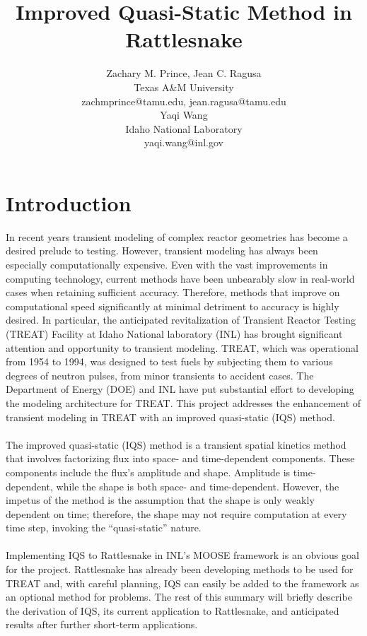 \documentclass[11pt]{scrartcl}
\title{Improved Quasi-Static Method in Rattlesnake}
\author{ 
{\normalsize Zachary M. Prince, Jean C. Ragusa} \\ 
{\normalsize Texas A\&M University} \\  
{\normalsize zachmprince@tamu.edu, jean.ragusa@tamu.edu} \\ 
{\normalsize Yaqi Wang} \\ 
{\normalsize Idaho National Laboratory} \\  
{\normalsize yaqi.wang@inl.gov}
}
\begin{document}
\maketitle
{}

\section{Introduction}
In recent years transient modeling of complex reactor geometries has become a desired prelude to testing.  However, transient modeling has always been especially computationally expensive. Even with the vast improvements in computing technology, current methods have been unbearably slow in real-world cases when retaining sufficient accuracy.  Therefore, methods that improve on computational speed significantly at minimal detriment to accuracy is highly desired.  In particular, the anticipated revitalization of Transient Reactor Testing (TREAT) Facility at Idaho National laboratory (INL) has brought significant attention and opportunity to transient modeling.  TREAT, which was operational from 1954 to 1994, was designed to test fuels by subjecting them to various degrees of neutron pulses, from minor transients to accident cases.  The Department of Energy (DOE) and INL have put substantial effort to developing the modeling architecture for TREAT.  This project addresses the enhancement of transient modeling in TREAT with an improved quasi-static (IQS) method.
\\ \\
The improved quasi-static (IQS) method is a transient spatial kinetics method that involves factorizing flux into space- and time-dependent components.  These components include the flux’s amplitude and shape. Amplitude is time-dependent, while the shape is both space- and time-dependent.  However, the impetus of the method is the assumption that the shape is only weakly dependent on time; therefore, the shape may not require computation at every time step, invoking the “quasi-static” nature.
\\ \\
Implementing IQS to Rattlesnake in INL’s MOOSE framework is an obvious goal for the project.  Rattlesnake has already been developing methods to be used for TREAT and, with careful planning, IQS can easily be added to the framework as an optional method for problems.  The rest of this summary will briefly describe the derivation of IQS, its current application to Rattlesnake, and anticipated results after further short-term applications.
\end{document}
